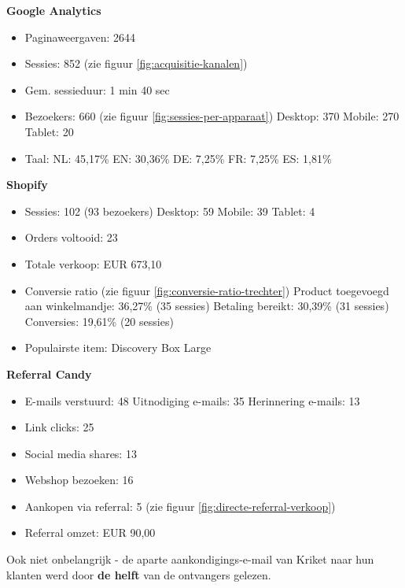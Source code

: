 \textbf{Google Analytics}
\begin{itemize}
	\item Paginaweergaven: 2644	
	\item Sessies: 852 (zie figuur \ref{fig:acquisitie-kanalen})
	\item Gem. sessieduur: 1 min 40 sec
	\item Bezoekers: 660 (zie figuur \ref{fig:sessies-per-apparaat})
		\subitem Desktop: 370
		\subitem Mobile: 270
		\subitem Tablet: 20
	\item Taal:
		\subitem NL: 45,17\%
		\subitem EN: 30,36\%
		\subitem DE: 7,25\%
		\subitem FR: 7,25\%
		\subitem ES: 1,81\%
\end{itemize}
\clearpage
\textbf{Shopify}
\begin{itemize}
	\item Sessies: 102 (93 bezoekers)
		\subitem Desktop: 59
		\subitem Mobile: 39
		\subitem Tablet: 4
	\item Orders voltooid: 23
	\item Totale verkoop: EUR 673,10
	\item Conversie ratio  (zie figuur \ref{fig:conversie-ratio-trechter})
		\subitem Product toegevoegd aan winkelmandje: 36,27\% (35 sessies)
		\subitem Betaling bereikt: 30,39\% (31 sessies)
		\subitem Conversies: 19,61\% (20 sessies)
	\item Populairste item: Discovery Box Large
\end{itemize}
\textbf{Referral Candy}
\begin{itemize}
	\item E-mails verstuurd: 48 
		\subitem Uitnodiging e-mails: 35
		\subitem Herinnering e-mails: 13 
	\item Link clicks: 25
	\item Social media shares: 13
	\item Webshop bezoeken: 16
	\item Aankopen via referral: 5 (zie figuur \ref{fig:directe-referral-verkoop})
	\item Referral omzet: EUR 90,00
\end{itemize}

Ook niet onbelangrijk - de aparte aankondigings-e-mail van Kriket naar hun klanten werd door \textbf{de helft} van de ontvangers gelezen.

